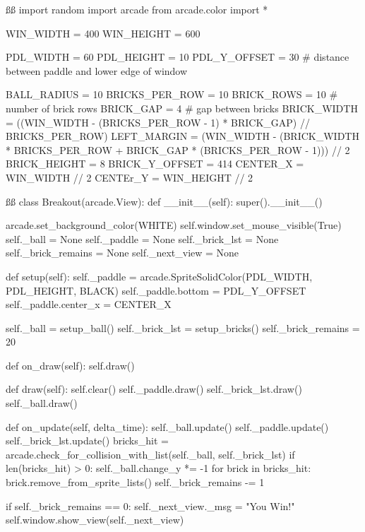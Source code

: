 %
\begin{py}
ß\label{lst:breakoutfull}ß
import random
import arcade
from arcade.color import *

WIN_WIDTH = 400
WIN_HEIGHT = 600

PDL_WIDTH = 60
PDL_HEIGHT = 10
PDL_Y_OFFSET = 30    # distance between paddle and lower edge of window

BALL_RADIUS = 10
BRICKS_PER_ROW = 10
BRICK_ROWS = 10      # number of brick rows
BRICK_GAP = 4        # gap between bricks
BRICK_WIDTH = ((WIN_WIDTH - (BRICKS_PER_ROW - 1) * BRICK_GAP)
               // BRICKS_PER_ROW)
LEFT_MARGIN = (WIN_WIDTH - (BRICK_WIDTH * BRICKS_PER_ROW +
                            BRICK_GAP * (BRICKS_PER_ROW - 1))) // 2
BRICK_HEIGHT = 8
BRICK_Y_OFFSET = 414
CENTER_X = WIN_WIDTH // 2
CENTEr_Y = WIN_HEIGHT // 2

ß\label{lst:breakout}ß
class Breakout(arcade.View):
    def __init__(self):
        super().__init__()

        arcade.set_background_color(WHITE)
        self.window.set_mouse_visible(True)
        self._ball = None
        self._paddle = None
        self._brick_lst = None
        self._brick_remains = None
        self._next_view = None

    def setup(self):
        self._paddle = arcade.SpriteSolidColor(PDL_WIDTH,
                                               PDL_HEIGHT,
                                               BLACK)
        self._paddle.bottom = PDL_Y_OFFSET
        self._paddle.center_x = CENTER_X

        self._ball = setup_ball()
        self._brick_lst = setup_bricks()
        self._brick_remains = 20

    def on_draw(self):
        self.draw()

    def draw(self):
        self.clear()
        self._paddle.draw()
        self._brick_lst.draw()
        self._ball.draw()

    def on_update(self, delta_time):
        self._ball.update()
        self._paddle.update()
        self._brick_lst.update()
        bricks_hit = arcade.check_for_collision_with_list(self._ball,
                                                          self._brick_lst)
        if len(bricks_hit) > 0:
            self._ball.change_y *= -1
        for brick in bricks_hit:
            brick.remove_from_sprite_lists()
            self._brick_remains -= 1

        if self._brick_remains == 0:
            self._next_view._msg = "You Win!"
            self.window.show_view(self._next_view)


\end{py}
